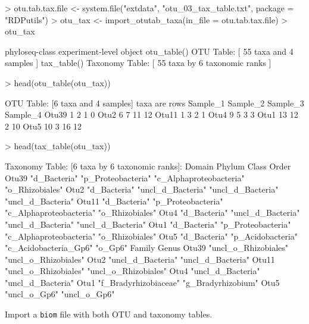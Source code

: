 \documentclass{article}
\begin{document}
\begin{Schunk}
\begin{Sinput}
> otu.tab.tax.file <- system.file("extdata", "otu_03_tax_table.txt", package = "RDPutils")
> otu_tax <- import_otutab_taxa(in_file = otu.tab.tax.file)
> otu_tax
\end{Sinput}
\begin{Soutput}
phyloseq-class experiment-level object
otu_table()   OTU Table:         [ 55 taxa and 4 samples ]
tax_table()   Taxonomy Table:    [ 55 taxa by 6 taxonomic ranks ]
\end{Soutput}
\begin{Sinput}
> head(otu_table(otu_tax))
\end{Sinput}
\begin{Soutput}
OTU Table:          [6 taxa and 4 samples]
                     taxa are rows
      Sample_1 Sample_2 Sample_3 Sample_4
Otu39        1        2        1        0
Otu2         6        7       11       12
Otu11        1        3        2        1
Otu4         9        5        3        3
Otu1        13       12        2       10
Otu5        10        3       16       12
\end{Soutput}
\begin{Sinput}
> head(tax_table(otu_tax))
\end{Sinput}
\begin{Soutput}
Taxonomy Table:     [6 taxa by 6 taxonomic ranks]:
      Domain       Phylum             Class                   Order            
Otu39 "d_Bacteria" "p_Proteobacteria" "c_Alphaproteobacteria" "o_Rhizobiales"  
Otu2  "d_Bacteria" "uncl_d_Bacteria"  "uncl_d_Bacteria"       "uncl_d_Bacteria"
Otu11 "d_Bacteria" "p_Proteobacteria" "c_Alphaproteobacteria" "o_Rhizobiales"  
Otu4  "d_Bacteria" "uncl_d_Bacteria"  "uncl_d_Bacteria"       "uncl_d_Bacteria"
Otu1  "d_Bacteria" "p_Proteobacteria" "c_Alphaproteobacteria" "o_Rhizobiales"  
Otu5  "d_Bacteria" "p_Acidobacteria"  "c_Acidobacteria_Gp6"   "o_Gp6"          
      Family                Genus               
Otu39 "uncl_o_Rhizobiales"  "uncl_o_Rhizobiales"
Otu2  "uncl_d_Bacteria"     "uncl_d_Bacteria"   
Otu11 "uncl_o_Rhizobiales"  "uncl_o_Rhizobiales"
Otu4  "uncl_d_Bacteria"     "uncl_d_Bacteria"   
Otu1  "f_Bradyrhizobiaceae" "g_Bradyrhizobium"  
Otu5  "uncl_o_Gp6"          "uncl_o_Gp6"        
\end{Soutput}
\end{Schunk}

Import a \texttt{biom} file with both OTU and taxonomy tables.  
\end{document}
